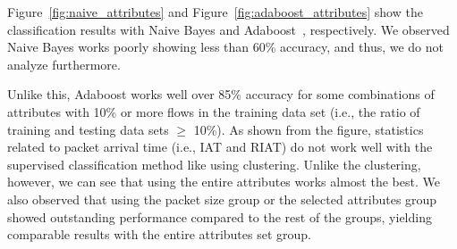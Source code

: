 \documentclass[conference]{IEEEtran}
\begin{document}

Figure~\ref{fig:naive_attributes} and Figure~\ref{fig:adaboost_attributes} show the classification results with Naive Bayes and Adaboost~\cite{freund1995desicion}, respectively.
We observed Naive Bayes works poorly showing less than 60\% accuracy, and thus, we do not analyze furthermore.

Unlike this, Adaboost works well over 85\% accuracy for some combinations of attributes with 10\% or more flows in the training data set (i.e., the ratio of training and testing data sets $\ge$ 10\%).
As shown from the figure, statistics related to packet arrival time (i.e., IAT and RIAT) do not work well with the supervised classification method like using clustering.
Unlike the clustering, however, we can see that using the entire attributes works almost the best.
We also observed that using the packet size group or the selected attributes group showed outstanding performance compared to the rest of the groups, yielding comparable results with the entire attributes set group.


\end{document}
